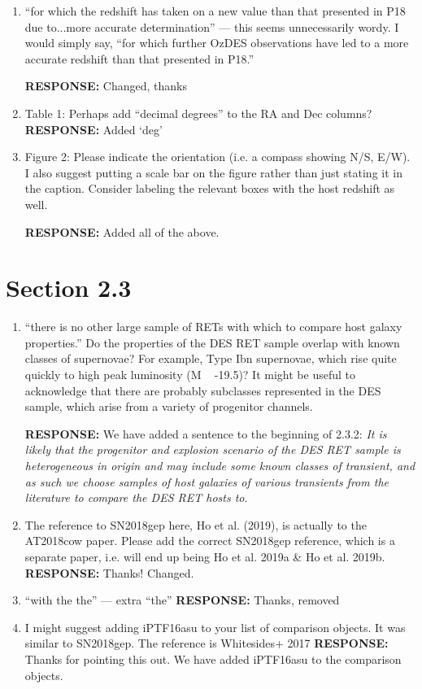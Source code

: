 \documentclass{article}
\begin{document}
\begin{enumerate}
\item  “for which the redshift has taken on a new value than that presented in P18 due to...more accurate determination” — this seems unnecessarily wordy. I would simply say, “for which further OzDES observations have led to a more accurate redshift than that presented in P18.”

\vskip0.1cm
{\bf RESPONSE: } Changed, thanks

\item[] Table 1: Perhaps add “decimal degrees” to the RA and Dec columns?
\vskip0.1cm
{\bf RESPONSE: } Added `deg' 
\item[] Figure 2: Please indicate the orientation (i.e. a compass showing N/S, E/W). I also suggest putting a scale bar on the figure rather than just stating it in the caption. Consider labeling the relevant boxes with the host redshift as well.

{\bf RESPONSE: } Added all of the above.

\end{enumerate}
\section*{Section 2.3}
\begin{enumerate}
    \item “there is no other large sample of RETs with which to compare host galaxy properties.” Do the properties of the DES RET sample overlap with known classes of supernovae? For example, Type Ibn supernovae, which rise quite quickly to high peak luminosity (M ~ -19.5)? It might be useful to acknowledge that there are probably subclasses represented in the DES sample, which arise from a variety of progenitor channels.
    
    \vskip0.1cm
    {\bf RESPONSE: } We have added a sentence to the beginning of 2.3.2: \textit{It is likely that the progenitor and explosion scenario of the DES RET sample is heterogeneous in origin and may include some known classes of transient, and as such we choose samples of host galaxies of various transients from the literature to compare the DES RET hosts to}.
    
\item The reference to SN2018gep here, Ho et al. (2019), is actually to the AT2018cow paper. Please add the correct SN2018gep reference, which is a separate paper, i.e. will end up being Ho et al. 2019a \& Ho et al. 2019b.
\vskip0.1cm
 {\bf RESPONSE: } Thanks! Changed.
 
 \item “with the the” — extra “the”
 \vskip0.1cm
 {\bf RESPONSE: } Thanks, removed
 
 \item I might suggest adding iPTF16asu to your list of comparison objects. It was similar to SN2018gep. The reference is Whitesides+ 2017
 \vskip0.1cm
 {\bf RESPONSE: } Thanks for pointing this out. We have added iPTF16asu to the comparison objects.

\end{enumerate}
\end{document}

